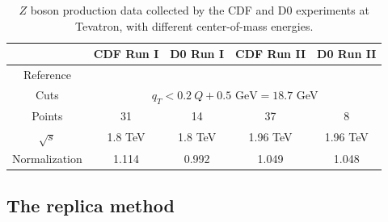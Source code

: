 \documentclass[aps,preprintnumbers,showpacs,nofootinbib,superscriptaddress,floatfix]{revtex4}
\begin{document}
\begin{table}[h!]
\begin{center}
\renewcommand{\tabcolsep}{0.4pc} %
\renewcommand{\arraystretch}{1.2} %
\begin{tabular}{|c|c|c|c|c|}
 \hline
 ~                        & CDF Run I    &  D0 Run I        & CDF Run II        & D0 Run II      \\
 \hline
 Reference        &\cite{Affolder:1999jh} &\cite{Abbott:1999wk}&\cite{Aaltonen:2012fi}&\cite{Abazov:2007ac} \\
\hline
Cuts             & \multicolumn{4}{c|}{$q_T< 0.2\ Q +0.5 \text{ GeV}=18.7$ GeV}                                  \\
\hline
 Points                   &      31      &   14             &       37          &        8       \\
 \hline
 $\sqrt{s}$               &      1.8 TeV &   1.8 TeV        &       1.96 TeV    &       1.96 TeV   \\
 \hline
Normalization        &  1.114       &    0.992          &       1.049        &       1.048    \\
\hline
\end{tabular}
\caption{$Z$ boson production data collected by the CDF and D0 experiments at Tevatron, with different center-of-mass energies.}
\label{t:data_Z}
\end{center}
\end{table}



\subsection{The replica method}
\label{ss:replica_method}
\end{document}
